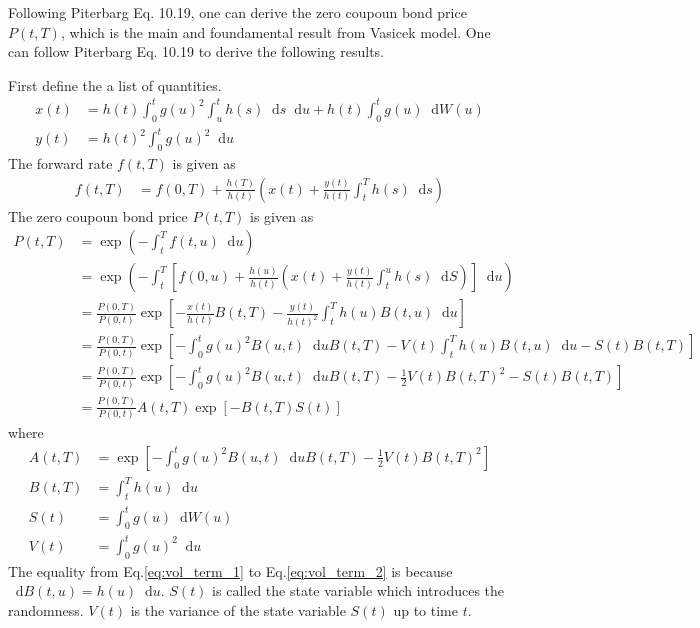 \documentclass[12pt]{article}
\newcommand{\dd}{\mathop{}\!\text{d}}
\newcommand{\qBrownian}[1]{W(#1)}
\newcommand{\piterbargEq}[1]{Piterbarg Eq. #1}
\begin{document}
Following \piterbargEq{10.19}, one can derive
the zero coupoun bond price $P(t,T)$, which is the main and foundamental result from Vasicek model.
One can follow \piterbargEq{10.19} to derive the following results.

First define the a list of quantities.
\begin{align}
    x(t) &= h(t) \int_0^t g(u)^2 \int_u^t h(s) \dd s \dd u + h(t) \int_0^t g(u) \dd \qBrownian{u} \\
    y(t) &= h(t)^2 \int_0^t g(u)^2 \dd u
\end{align}
The forward rate $f(t, T)$ is given as
\begin{align}
    f(t,T) &= f(0, T) + \frac{h(T)}{h(t)}
        \left(
            x(t) + \frac{y(t)}{h(t)} \int_t^T h(s) \dd s 
        \right)
\end{align}
The zero coupoun bond price $P(t, T)$ is given as
\begin{align}
    P(t, T) &= \exp \left( -\int_t^T f(t, u) \dd u \right) \\
        &=\exp \left( 
            -\int_t^T \left[ 
                f(0,u) + \frac{h(u)}{h(t)} \left(
                    x(t) + \frac{y(t)}{h(t)} \int_t^u h(s) \dd S
                    \right)
            \right] \dd u
        \right) \\
        &=\frac{P(0,T)}{P(0,t)} \exp \left[
            -\frac{x(t)}{h(t)} B(t,T) - \frac{y(t)}{h(t)^2} \int_t^T h(u) B(t, u) \dd u 
        \right] \\
        \label{eq:vol_term_1}
        &=\frac{P(0,T)}{P(0,t)} \exp \left[
            -\int_0^t g(u)^2 B(u, t) \dd u B(t,T) - V(t) \int_t^T h(u) B(t, u) \dd u
            -S(t) B(t,T)
        \right] \\
        \label{eq:vol_term_2}
        &=\frac{P(0,T)}{P(0,t)} \exp \left[
            -\int_0^t g(u)^2 B(u, t) \dd u B(t,T) - \frac{1}{2} V(t) B(t, T)^2 
            -S(t) B(t,T)
        \right] \\
        \label{eq:bond_price_start}
        &=\frac{P(0, T)}{P(0, t)} A(t,T) \exp\left[-B(t,T) S(t)\right]
\end{align}
where
\begin{align}
    A(t, T) &=\exp \left[
        -\int_0^t g(u)^2 B(u, t) \dd u B(t,T) - \frac{1}{2} V(t) B(t, T)^2 
    \right] \\
    B(t, T) &= \int_t^T h(u) \dd u \\
    S(t) &= \int_0^t g(u) \dd \qBrownian{u} \\
    \label{eq:bond_price_end}
    V(t) &= \int_0^t g(u)^2 \dd u
\end{align}
The equality from Eq.\ref{eq:vol_term_1} to Eq.\ref{eq:vol_term_2} is because
$\dd B(t,u) = h(u) \dd u$. $S(t)$ is called the state variable which introduces
the randomness. $V(t)$ is the variance of the state variable $S(t)$ up to time $t$.
\end{document}
